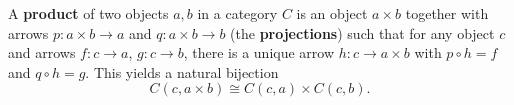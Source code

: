 A \textbf{product} of two objects $a, b$ in a category $C$ is an object $a \times b$ together with arrows $p: a \times b \to a$ and $q: a \times b \to b$ (the \textbf{projections}) such that for any object $c$ and arrows $f: c \to a$, $g: c \to b$, there is a unique arrow $h: c \to a \times b$ with $p \circ h = f$ and $q \circ h = g$. This yields a natural bijection
$$C(c, a \times b) \cong C(c, a) \times C(c, b).$$
